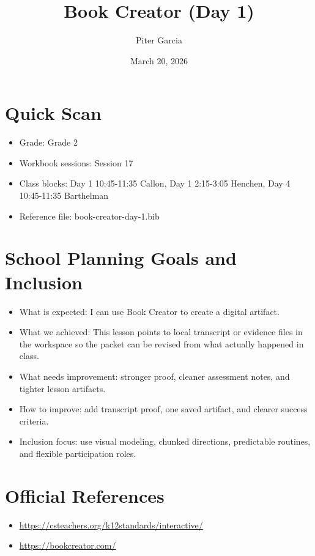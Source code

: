 \documentclass[11pt]{article}
\title{Book Creator (Day 1)}
\author{Piter Garcia}
\date{March 20, 2026}
\begin{document}
    \maketitle
    \section*{Quick Scan}
    \begin{itemize}[leftmargin=*]
    \item Grade: Grade 2
    \item Workbook sessions: Session 17
    \item Class blocks: Day 1 10:45-11:35 Callon, Day 1 2:15-3:05 Henchen, Day 4 10:45-11:35 Barthelman
    \item Reference file: book-creator-day-1.bib
    \end{itemize}
    \section*{School Planning Goals and Inclusion}
    \begin{itemize}[leftmargin=*]
    \item What is expected: I can use Book Creator to create a digital artifact.
    \item What we achieved: This lesson points to local transcript or evidence files in the workspace so the packet can be revised from what actually happened in class.
    \item What needs improvement: stronger proof, cleaner assessment notes, and tighter lesson artifacts.
    \item How to improve: add transcript proof, one saved artifact, and clearer success criteria.
    \item Inclusion focus: use visual modeling, chunked directions, predictable routines, and flexible participation roles.
    \end{itemize}
    \section*{Official References}
    \begin{itemize}[leftmargin=*]
    \item \url{https://csteachers.org/k12standards/interactive/}
\item \url{https://bookcreator.com/}

    \end{itemize}
    
\end{document}
